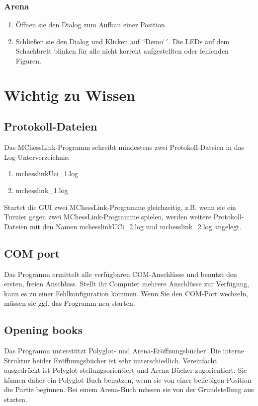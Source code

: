 \documentclass[11pt,a4paper]{article}
\begin{document}
\subsubsection{Arena}
\begin{enumerate}
  \item Öffnen sie den Dialog zum Aufbau einer Position.
  \item Schließen sie den Dialog und Klicken auf ``Demo`´. Die LEDs auf dem Schachbrett blinken für alle nicht korrekt aufgestellten oder fehlenden Figuren.
\end{enumerate}

\section{Wichtig zu Wissen}
\subsection{Protokoll-Dateien}
Das MChessLink-Programm schreibt mindestens zwei Protokoll-Dateien in das Log-Unterverzeichnis:
\begin{enumerate}
  \item mchesslinkUci\_1.log
  \item mchesslink\_1.log
\end{enumerate}
Startet die GUI zwei MChessLink-Programme gleichzeitig, z.B. wenn sie ein Turnier gegen zwei MChessLink-Programme spielen, werden weitere Protokoll-Dateien mit den Namen mchesslinkUCi\_2.log und mchesslink\_2.log angelegt.


\subsection{COM port}
Das Programm ermittelt alle verfügbaren COM-Anschlüsse und benutzt den ersten, freien Anschluss. Stellt ihr Computer mehrere Anschlüsse zur Verfügung, kann es zu einer Fehlkonfiguration kommen. Wenn Sie den COM-Port wechseln, müssen sie ggf. das Programm neu starten.

\subsection{Opening books}
Das Programm unterstützt Polyglot- und Arena-Eröffnungsbücher. Die interne Struktur beider Eröffnungsbücher ist sehr unterschiedlich. Vereinfacht ausgedrückt ist Polyglot stellungsorientiert und Arena-Bücher zugorientiert. Sie können daher ein Polyglot-Buch benutzen, wenn sie von einer beliebigen Position die Partie beginnen. Bei einem Arena-Buch müssen sie von der Grundstellung aus starten.
\end{document}
